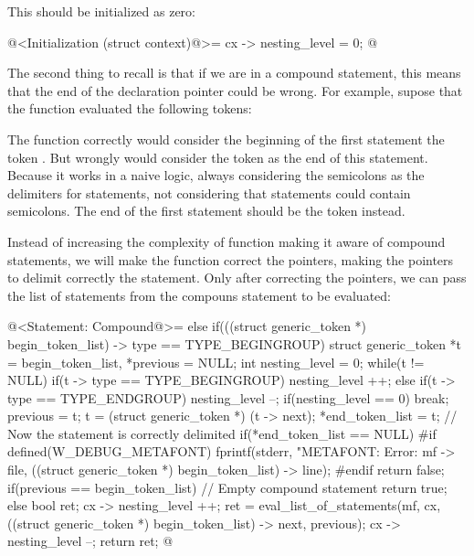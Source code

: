 This should be initialized as zero:

\iniciocodigo
@<Initialization (struct context)@>=
  cx -> nesting_level = 0;
@
\fimcodigo


The second thing to recall is that if we are in a compound statement,
this means that the end of the declaration pointer could be wrong.
For example, supose that the
function  evaluated the
following tokens:

\alinhaverbatim
[begingroup][T1][T2][;][T3][T4][;][endgroup][;]
\alinhanormal

The function correctly would consider the beginning of the first
statement the token . But wrongly would
consider the token  as the end of this statement.
Because it works in a naive logic, always considering the semicolons
as the delimiters for statements, not considering that statements
could contain semicolons. The end of the first statement should be the
token  instead.

Instead of increasing the complexity of
function  making it aware of
compound statements, we will make the
function  correct the pointers, making
the pointers to delimit correctly the statement. Only after correcting
the pointers, we can pass the list of statements from the compouns
statement to be evaluated:

\iniciocodigo
@<Statement: Compound@>=
else if(((struct generic_token *) begin_token_list) -> type ==
        TYPE_BEGINGROUP){
  struct generic_token *t = begin_token_list, *previous = NULL;
  int nesting_level = 0;
  while(t != NULL){
    if(t -> type == TYPE_BEGINGROUP)
      nesting_level ++;
    else if(t -> type == TYPE_ENDGROUP){
      nesting_level --;
      if(nesting_level == 0)
        break;
    }
    previous = t;
    t = (struct generic_token *) (t -> next);
  }
  *end_token_list = t; // Now the statement is correctly delimited
  if(*end_token_list == NULL){
#if defined(W_DEBUG_METAFONT)
    fprintf(stderr, "METAFONT: Error: %
            mf -> file,
            ((struct generic_token *) begin_token_list) -> line);
#endif
    return false;
  }
  if(previous == begin_token_list) // Empty compound statement
    return true;
  else{
    bool ret;
    cx -> nesting_level ++;
    ret = eval_list_of_statements(mf, cx, ((struct generic_token *)
                                         begin_token_list) -> next,
                                  previous);
    cx -> nesting_level --;
    return ret;
  }
}
@
\fimcodigo


